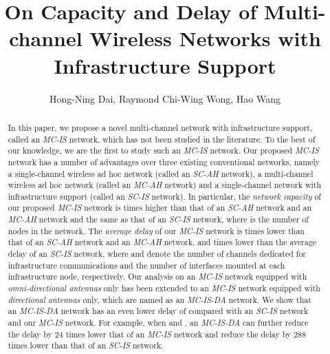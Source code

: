 \documentclass[10pt,journal]{IEEEtran}
\begin{document}

\title{On Capacity and Delay of Multi-channel Wireless Networks with Infrastructure Support}

\author{Hong-Ning Dai, Raymond Chi-Wing Wong, Hao Wang}
\maketitle

\begin{abstract}

In this paper, we propose a novel multi-channel network with infrastructure support, called an \textit{MC-IS} network, which has not been studied in the literature. To the best of our knowledge, we are the first to study such an \textit{MC-IS} network. Our proposed \textit{MC-IS} network has a number of advantages over three existing conventional networks, namely a single-channel wireless ad hoc network (called an \textit{SC-AH} network), a multi-channel wireless ad hoc network (called an \textit{MC-AH} network) and a single-channel network with infrastructure support (called an \textit{SC-IS} network). In particular, the \textit{network capacity} of our proposed \textit{MC-IS} network is  times higher than that of an \textit{SC-AH} network and an \textit{MC-AH} network and the same as that of an \textit{SC-IS} network, where  is the number of nodes in the network. The \textit{average delay} of our \textit{MC-IS} network is  times lower than that of an \textit{SC-AH} network and an \textit{MC-AH} network, and  times lower than the average delay of an \textit{SC-IS} network, where  and  denote the number of channels dedicated for infrastructure communications and the number of interfaces mounted at each infrastructure node, respectively. Our analysis on an \emph{MC-IS} network equipped with \emph{omni-directional antennas} only has been extended to an \emph{MC-IS} network equipped with \emph{directional antennas} only, which are named as an \emph{MC-IS-DA} network. We show that an \emph{MC-IS-DA} network has an even lower delay of  compared with an \emph{SC-IS} network and our \emph{MC-IS} network. For example, when  and , an \emph{MC-IS-DA} can further reduce the delay by 24 times lower that of an \emph{MC-IS} network and reduce the delay by 288 times lower than that of an \emph{SC-IS} network.

\end{abstract}



\IEEEpeerreviewmaketitle
\end{document}
